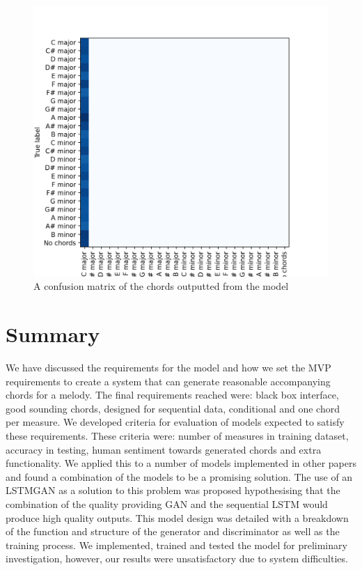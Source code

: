 \begin{figure}
    \centering
    \includegraphics[width=0.4\columnwidth]{Figures/confusion_real}
    \decoRule
    \caption{A confusion matrix of the chords outputted from the model}
    \label{fig:confusion_real}
\end{figure}

\section{Summary}

We have discussed the requirements for the model and how we set the MVP requirements to create a system that can generate reasonable accompanying chords for a melody.
The final requirements reached were: black box interface, good sounding chords, designed for sequential data, conditional and one chord per measure.
We developed criteria for evaluation of models expected to satisfy these requirements.
These criteria were: number of measures in training dataset, accuracy in testing, human sentiment towards generated chords and extra functionality.  
We applied this to a number of models implemented in other papers and found a combination of the models to be a promising solution. 
The use of an LSTMGAN as a solution to this problem was proposed hypothesising that the combination of the quality providing GAN and the sequential LSTM would produce high quality outputs.
This model design was detailed with a breakdown of the function and structure of the generator and discriminator as well as the training process.
We implemented, trained and tested the model for preliminary investigation, however, our results were unsatisfactory due to system difficulties.
